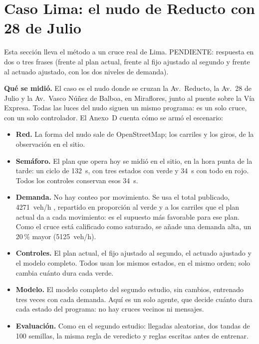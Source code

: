 \section{Caso Lima: el nudo de Reducto con 28 de Julio}
\label{sec:caso-lima}
\suppressfloats[t]

Esta sección lleva el método a un cruce real de Lima. PENDIENTE: respuesta
en dos o tres frases (frente al plan actual, frente al fijo ajustado al
segundo y frente al actuado ajustado, con los dos niveles de demanda).

\noindent\textbf{Qué se midió.} El caso es el nudo donde se cruzan la
Av.~Reducto, la Av.~28 de Julio y la Av.~Vasco Núñez de Balboa, en
Miraflores, junto al puente sobre la Vía Expresa. Todas las luces del
nudo siguen un mismo programa: es un solo cruce, con un solo
controlador. El Anexo~D cuenta cómo se armó el escenario:
\begin{itemize}
  \item \textbf{Red.} La forma del nudo sale de OpenStreetMap; los
    carriles y los giros, de la observación en el sitio.
  \item \textbf{Semáforo.} El plan que opera hoy se midió en el sitio,
    en la hora punta de la tarde: un ciclo de 132~s, con tres estados
    con verde y 34~s con todo en rojo. Todos los controles conservan
    esos 34~s.
  \item \textbf{Demanda.} No hay conteo por movimiento. Se usa el total
    publicado, 4271~veh/h \citep{Miraflores2017_PMU}, repartido en
    proporción al verde y a los carriles que el plan actual da a cada
    movimiento: es el supuesto más favorable para ese plan. Como el
    cruce está calificado como saturado, se añade una demanda alta, un
    20\,\% mayor (5125~veh/h).
  \item \textbf{Controles.} El plan actual, el fijo ajustado al segundo,
    el actuado ajustado y el modelo completo. Todos usan los mismos
    estados, en el mismo orden; solo cambia cuánto dura cada verde.
  \item \textbf{Modelo.} El modelo completo del segundo estudio, sin
    cambios, entrenado tres veces con cada demanda. Aquí es un solo
    agente, que decide cuánto dura cada estado del programa: no hay
    cruces vecinos ni mensajes.
  \item \textbf{Evaluación.} Como en el segundo estudio: llegadas
    aleatorias, dos tandas de 100 semillas, la misma regla de veredicto
    y reglas escritas antes de entrenar.
\end{itemize}


